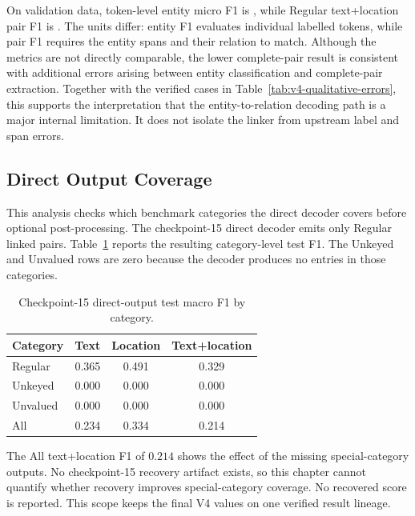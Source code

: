 On validation data, token-level entity micro F1 is
\VFourEntityMicroFOne{}, while Regular text+location pair F1 is
\VFourValCombinedFOne{}. The units differ: entity F1 evaluates individual
labelled tokens, while pair F1 requires the entity spans and their relation to
match. Although the metrics are not directly comparable, the lower complete-pair
result is consistent with additional errors arising between entity
classification and complete-pair extraction. Together with the verified cases
in Table~\ref{tab:v4-qualitative-errors}, this supports the interpretation that
the entity-to-relation decoding path is a major internal limitation. It does
not isolate the linker from upstream label and span errors.

\subsection{Direct Output Coverage}

This analysis checks which benchmark categories the direct decoder covers
before optional post-processing. The checkpoint-15 direct decoder emits only
Regular linked pairs. Table~\ref{tab:v4-output-coverage} reports the resulting
category-level test F1.
The Unkeyed and Unvalued rows are zero because the decoder produces no entries
in those categories.

\begin{table}[ht]
  \centering
  \caption{Checkpoint-15 direct-output test macro F1 by category.}
  \label{tab:v4-output-coverage}
  \begin{tabular}{@{}lccc@{}}
    \toprule
    \textbf{Category} & \textbf{Text} & \textbf{Location} & \textbf{Text+location} \\
    \midrule
    Regular  & 0.365 & 0.491 & 0.329 \\
    Unkeyed  & 0.000 & 0.000 & 0.000 \\
    Unvalued & 0.000 & 0.000 & 0.000 \\
    All      & 0.234 & 0.334 & 0.214 \\
    \bottomrule
  \end{tabular}
\end{table}

The All text+location F1 of $0.214$ shows the effect of the missing
special-category outputs. No checkpoint-15 recovery artifact exists, so this
chapter cannot quantify whether recovery improves special-category coverage.
No recovered score is reported. This scope keeps the final V4 values on one
verified result lineage.

